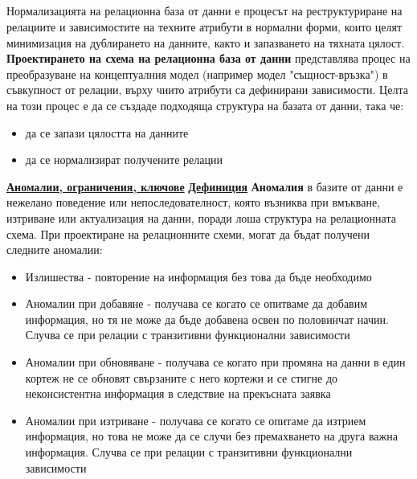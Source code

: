 \documentclass{article}
\begin{document}
\subsection*{\color{bordeaux}{24. Бази от данни. Нормални форми.}}
Нормализацията на релационна база от данни е процесът на реструктуриране на релациите и зависимостите на техните атрибути в нормални форми,
които целят минимизация на дублирането на данните, както и запазването на тяхната цялост. \newline\newline
\textbf{Проектирането на схема на релационна база от данни} представлява процес на преобразуване на концептуалния модел (например модел "същност-връзка") в
съвкупност от релации, върху чиито атрибути са дефинирани зависимости. Целта на този процес е да се създаде подходяща структура на базата от данни, така че:
\begin{itemize}
    \item да се запази цялостта на данните
    \item да се нормализират получените релации
\end{itemize}
\textbf{\underline{Аномалии, ограничения, ключове}} \newline\newline
\textbf{\underline{Дефиниция}}
\textbf{Аномалия} в базите от данни е нежелано поведение или непоследователност, която възниква при вмъкване, изтриване или актуализация на данни,
поради лоша структура на релационната схема. \newline\newline
При проектиране на релационните схеми, могат да бъдат получени следните аномалии:
\begin{itemize}
    \item Излишества - повторение на информация без това да бъде необходимо
    \item Аномалии при добавяне - получава се когато се опитваме да добавим информация, но тя не може да бъде добавена освен по половинчат начин.
    Случва се при релации с транзитивни функционални зависимости
    \item Аномалии при обновяване - получава се когато при промяна на данни в един кортеж не се обновят свързаните с него кортежи и се стигне
    до неконсистентна информация в следствие на прекъсната заявка
    \item Аномалии при изтриване - получава се когато се опитаме да изтрием информация, но това не може да се случи без премахването на друга
    важна информация. Случва се при релации с транзитивни функционални зависимости
\end{itemize}
\end{document}

